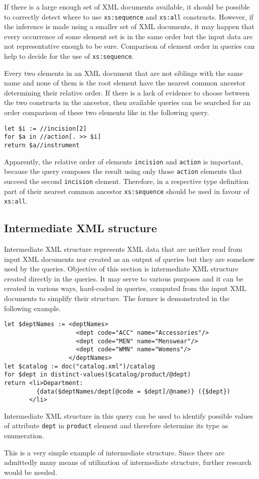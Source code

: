 If there is a large enough set of XML documents available, it should be possible to correctly detect where to use \texttt{xs:sequence} and \texttt{xs:all} constructs. However, if the inference is made using a smaller set of XML documents, it may happen that every occurrence of some element set is in the same order but the input data are not representative enough to be sure. Comparison of element order in queries can help to decide for the use of \texttt{xs:sequence}.

Every two elements in an XML document that are not siblings with the same name and none of them is the root element have the nearest common ancestor determining their relative order. If there is a lack of evidence to choose between the two constructs in the ancestor, then available queries can be searched for an order comparison of these two elements like in the following query.

\begin{verbatim}
let $i := //incision[2]
for $a in //action[. >> $i]
return $a//instrument
\end{verbatim}

Apparently, the relative order of elements \texttt{incision} and \texttt{action} is important, because the query composes the result using only those \texttt{action} elements that succeed the second \texttt{incision} element. Therefore, in a respective type definition part of their nearest common ancestor \texttt{xs:sequence} should be used in favour of \texttt{xs:all}.

\subsection{Intermediate XML structure}
Intermediate XML structure represents XML data that are neither read from input XML documents nor created as an output of queries but they are somehow used by the queries. Objective of this section is intermediate XML structure created directly in the queries. It may serve to various purposes and it can be created in various ways, hard-coded in queries, computed from the input XML documents to simplify their structure. The former is demonstrated in the following example.

\begin{verbatim}
let $deptNames := <deptNames> 
                    <dept code="ACC" name="Accessories"/> 
                    <dept code="MEN" name="Menswear"/> 
                    <dept code="WMN" name="Womens"/> 
                  </deptNames> 
let $catalog := doc("catalog.xml")/catalog 
for $dept in distinct-values($catalog/product/@dept) 
return <li>Department:
         {data($deptNames/dept[@code = $dept]/@name)} ({$dept})
       </li> 
\end{verbatim}

Intermediate XML structure in this query can be used to identify possible values of attribute \texttt{dept} in \texttt{product} element and therefore determine its type as enumeration.

This is a very simple example of intermediate structure. Since there are admittedly many means of utilization of intermediate structure, further research would be needed.